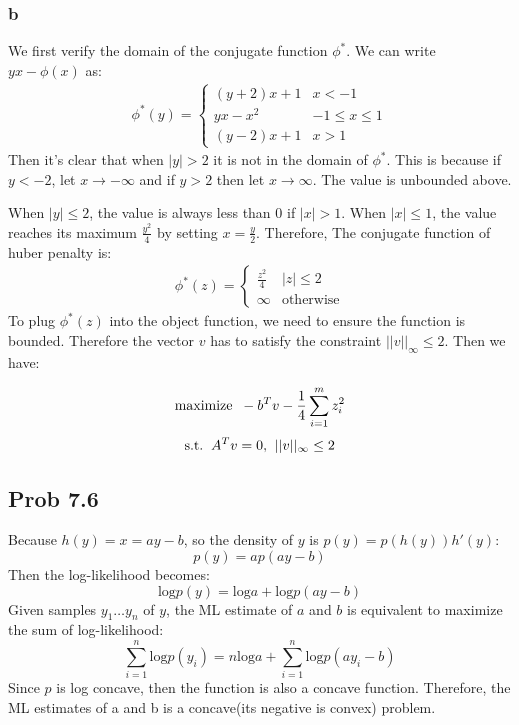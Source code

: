 \message{ !name(ass4_ChangLi.tex)}\documentclass[10pt,a4paper]{article}
\begin{document}
\subsubsection{b}
We first verify the domain of the conjugate function $\phi^*$. We can
write $yx-\phi(x)$ as:
\begin{align*}
  \phi^*(y)=
  \begin{cases}
    (y+2)x+1 & x<-1\\
    yx-x^2 & -1\leq x\leq 1\\
    (y-2)x+1 & x>1
  \end{cases}
\end{align*}
Then it's clear that when $|y|>2$ it is not in the domain of
$\phi^*$. This is because if $y<-2$, let $x\rightarrow
-\infty$ and if $y>2$ then let $x \rightarrow \infty$. The
value is unbounded above.

When $|y|\leq 2$, the value is always less than $0$ if
$|x|>1$. When $|x|\leq 1$, the value reaches its maximum
$\frac{y^2}{4}$ by setting $x=\frac{y}{2}$.
Therefore, The conjugate function of huber penalty
is:
\begin{align*}
  \phi^*(z) = 
  \begin{cases}
    \frac{z^2}{4} & |z|\leq 2\\
    \infty & \text{otherwise}
  \end{cases}
\end{align*}
To plug $\phi^*(z)$ into the object function, we need to
ensure the function is bounded. Therefore the vector $v$
has to satisfy the constraint $||v||_{\infty}\leq 2$. Then
we have:

$$\text{maximize\;\;} -b^Tv-\frac{1}{4}\sum_{i=1}^{m}z_i^2$$
$$\text{s.t.\;\;} A^Tv=0\text{,\;\;} ||v||_{\infty}\leq 2$$

\subsection{Prob 7.6}

Because $h(y)=x=ay-b$, so the density of $y$ is
$p(y)=p(h(y))h'(y)$:
$$p(y)= ap(ay-b)$$ 
Then the log-likelihood becomes:
$$ \text{log}p(y) = \text{log}a + \text{log}p(ay-b)$$
Given samples $y_1\dots y_n$ of $y$, the ML estimate of $a$
and $b$ is equivalent to maximize the sum of log-likelihood:
$$\sum_{i=1}^{n}\text{log}p(y_i)=n\text{log}a+\sum_{i=1}^{n}\text{log}p(ay_i-b)$$
Since $p$ is log concave, then the function is also a
concave function. Therefore, the ML estimates of a and b is
a concave(its negative is convex) problem.
\end{document}
